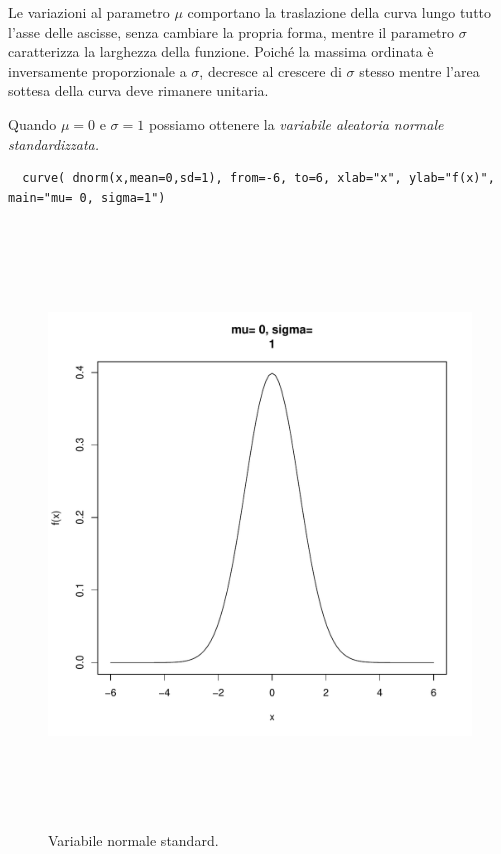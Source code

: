 Le variazioni al parametro $\mu$ comportano la traslazione della curva lungo tutto l'asse delle ascisse, senza cambiare la propria forma, mentre il parametro $\sigma$ caratterizza la larghezza della funzione. Poiché la massima ordinata è inversamente proporzionale a $\sigma$, decresce al crescere di $\sigma$ stesso mentre l'area sottesa della curva deve rimanere unitaria.

Quando $\mu = 0$ e $\sigma = 1$ possiamo ottenere la \textit{variabile aleatoria normale standardizzata.}

\vspace{5mm}
\begin{lstlisting}
  curve( dnorm(x,mean=0,sd=1), from=-6, to=6, xlab="x", ylab="f(x)", main="mu= 0, sigma=1")
\end{lstlisting}
\vspace{5mm}

\begin{figure}[!htb]
    \centering
    \includegraphics[height=16cm]{capitoli/images/1_introduzione/var_norm_stand.pdf}
    \caption{Variabile normale standard.}
\end{figure}

